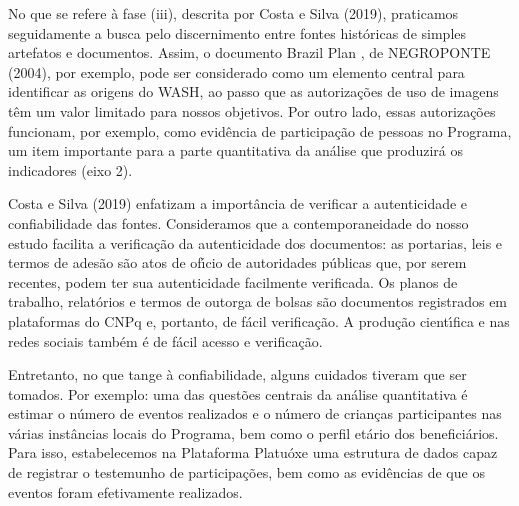 \documentclass[
12pt,		%
openright,	%
twoside,  %
a4paper,			%
chapter=TITLE,		%
english,			%
french,				%
spanish,			%
brazil				%
]{USPSC-classe/USPSC}
\begin{document}
No que se refere \`a fase (iii), descrita por  Costa e Silva (2019), praticamos seguidamente a busca pelo discernimento entre fontes hist\'oricas de simples artefatos e documentos. Assim, o documento \textquotedbl Brazil Plan \textquotedbl , de  NEGROPONTE (2004), por exemplo, pode ser considerado como um elemento central para identificar as origens do WASH, ao passo que as autoriza\c{c}\~oes de uso de imagens t\^em um valor limitado para nossos objetivos.  Por outro lado, essas autoriza\c{c}\~oes funcionam, por exemplo, como evid\^encia de participa\c{c}\~ao de pessoas no Programa, um item importante para a parte quantitativa da an\'alise que produzir\'a os indicadores (eixo 2).

















Costa e Silva (2019) enfatizam a import\^ancia de verificar a autenticidade e confiabilidade das fontes. Consideramos que a contemporaneidade do nosso estudo facilita a verifica\c{c}\~ao da autenticidade dos documentos: as portarias, leis e termos de ades\~ao s\~ao atos de of\'{\i}cio de autoridades p\'ublicas que, por serem recentes, podem ter sua autenticidade facilmente verificada. Os planos de trabalho, relat\'orios e termos de outorga de bolsas s\~ao documentos registrados em plataformas do CNPq e, portanto, de f\'acil verifica\c{c}\~ao. A produ\c{c}\~ao cient\'{\i}fica e nas redes sociais tamb\'em \'e de f\'acil acesso e verifica\c{c}\~ao.

















Entretanto, no que tange \`a confiabilidade, alguns cuidados tiveram que ser tomados. Por exemplo: uma das quest\~oes centrais da an\'alise quantitativa \'e estimar o n\'umero de eventos realizados e o n\'umero de crian\c{c}as participantes nas v\'arias inst\^ancias locais do Programa, bem como o perfil et\'ario dos benefici\'arios. Para isso, estabelecemos na Plataforma Platu\'oxe uma estrutura de dados capaz de registrar o testemunho de participa\c{c}\~oes, bem como as evid\^encias de que os eventos foram efetivamente realizados.
\end{document}
